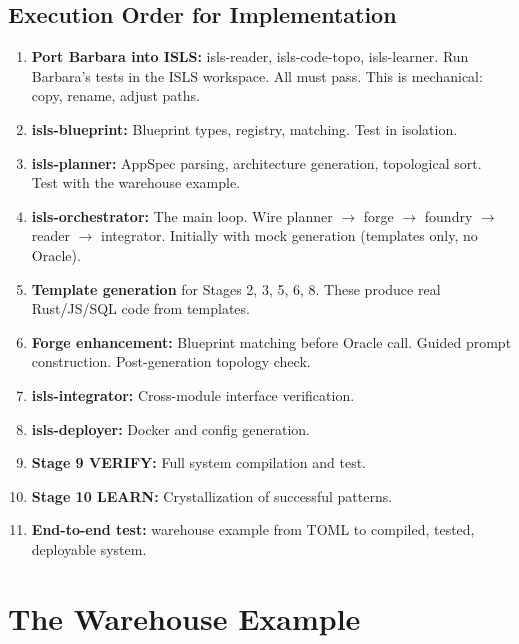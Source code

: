 \documentclass[11pt,a4paper]{article}
\begin{document}
\subsection{Execution Order for Implementation}

\begin{enumerate}
\item \textbf{Port Barbara into ISLS:} isls-reader, isls-code-topo,
  isls-learner. Run Barbara's tests in the ISLS workspace. All must
  pass. This is mechanical: copy, rename, adjust paths.

\item \textbf{isls-blueprint:} Blueprint types, registry, matching.
  Test in isolation.

\item \textbf{isls-planner:} AppSpec parsing, architecture generation,
  topological sort. Test with the warehouse example.

\item \textbf{isls-orchestrator:} The main loop. Wire planner $\to$
  forge $\to$ foundry $\to$ reader $\to$ integrator. Initially with
  mock generation (templates only, no Oracle).

\item \textbf{Template generation} for Stages 2, 3, 5, 6, 8.
  These produce real Rust/JS/SQL code from templates.

\item \textbf{Forge enhancement:} Blueprint matching before Oracle
  call. Guided prompt construction. Post-generation topology check.

\item \textbf{isls-integrator:} Cross-module interface verification.

\item \textbf{isls-deployer:} Docker and config generation.

\item \textbf{Stage 9 VERIFY:} Full system compilation and test.

\item \textbf{Stage 10 LEARN:} Crystallization of successful patterns.

\item \textbf{End-to-end test:} warehouse example from TOML to
  compiled, tested, deployable system.
\end{enumerate}

\section{The Warehouse Example}
\end{document}

